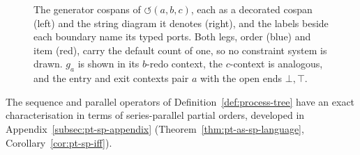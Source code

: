 \begin{figure}[tp]
  \centering
  \resizebox{\textwidth}{!}{\unskip}
  \caption{The generator cospans of $\circlearrowleft(a,b,c)$, each as a decorated cospan (left) and
    the string diagram it denotes (right), and the labels beside each boundary name its typed ports.
    Both legs, order (blue) and item
    (red), carry the default count of one, so no constraint system is drawn. $g_a$ is shown in its $b$-redo context, the
    $c$-context is analogous, and the entry and exit contexts pair $a$ with the open ends $\bot,\top$.}
  \label{fig:re-loop-cospans}
\end{figure}

The sequence and parallel operators of Definition~\ref{def:process-tree} have an exact
characterisation in terms of series-parallel partial orders, developed in
Appendix~\ref{subsec:pt-sp-appendix} (Theorem~\ref{thm:pt-as-sp-language},
Corollary~\ref{cor:pt-sp-iff}).

